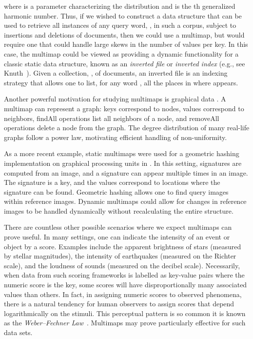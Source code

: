 \documentclass[11pt,letterpaper]{article}
\begin{document}
where  is a parameter characterizing the distribution and
 is the th generalized harmonic number.
Thus, if we wished to construct a data structure that can be used
to retrieve all instances of any query word, , in such a corpus, 
subject to insertions and deletions of documents, then we could
use a multimap, but would require one that could handle large skews
in the number of values per key.  
In this case, the multimap could be viewed
as providing a dynamic functionality for
a classic static data structure, known as an \emph{inverted file}
or \emph{inverted index} (e.g., see Knuth~\cite{k-ss-73}).
Given a collection, , of documents, an inverted file is an
indexing strategy that allows one to list, for any word ,
all the places in  where  appears.

Another powerful motivation for studying multimaps is graphical
data \cite{bb-cdvk-08}.  A multimap can represent a graph: keys
correspond to nodes, values correspond to neighbors, findAll
operations list all neighbors of a node, and removeAll operations
delete a node from the graph.  The degree distribution of many
real-life graphs follow a power law, motivating efficient handling of
non-uniformity.  

As a more recent example, static multimaps were used for a geometric
hashing implementation on graphical processing units
in \cite{asasmoa-rtphg-09}.  In this setting, signatures are computed from
an image, and a signature can appear multiple times in an image.  The
signature is a key, and the values correspond to locations where the
signature can be found.  Geometric hashing allows one to find query
images within reference images.  Dynamic multimaps could allow for
changes in reference images to be handled dynamically without
recalculating the entire structure.

There are countless other possible scenarios where we expect 
multimaps can prove useful.  In many settings, one can indicate the
intensity of an event or object by a score.  Examples include the
apparent brightness of stars (measured by stellar magnitudes), the
intensity of earthquakes (measured on the Richter scale), and the
loudness of sounds (measured on the decibel scale).  Necessarily,
when data from such scoring frameworks is labelled as key-value pairs
where the numeric score is the key, some scores will have
disproportionally many associated values than others.  In fact, in
assigning numeric scores to observed phenomena, there is a natural
tendency for human observers to assign scores that depend
logarithmically on the stimuli. This perceptual pattern is so common
it is known as the
\emph{Weber--Fechner Law}~\cite{Dehaene2003145,h-vdiwf-24}.
Multimaps may prove particularly effective for such data sets.
\end{document}
